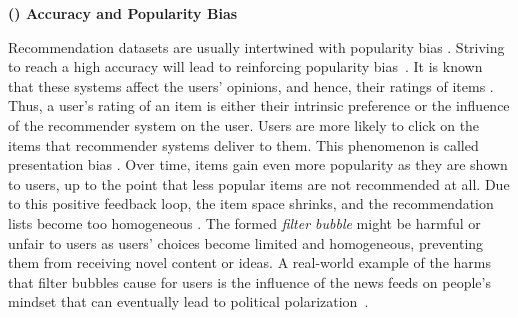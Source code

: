 

\vspace{0.25cm}
\noindent \textbf{() Accuracy and Popularity Bias}
\vspace{0.25cm}

Recommendation datasets are usually intertwined with popularity bias \cite{celma2008hits,lee2014fairness}. Striving to reach a high accuracy will lead to reinforcing popularity bias~\cite{barocas2016big}. It is known that these systems affect the users’ opinions, and hence, their ratings of items \cite{Cosley2003Influence}. Thus, a user’s rating of an item is either their intrinsic preference or the influence of the recommender system on the user. Users are more likely to click on the items that recommender systems deliver to them. This phenomenon is called presentation bias \cite{baeza2018bias}. 
Over time, items gain even more popularity as they are shown to users, up to the point that less popular items are not recommended at all. Due to this positive feedback loop, the item space shrinks, and the recommendation lists become too homogeneous \cite{Chaney2018Homogeneity}. The formed \textit{filter bubble} might be harmful or unfair to users as users' choices become limited and homogeneous, preventing them from receiving novel content or ideas. A real-world example of the harms that filter bubbles cause for users is the influence of the news feeds on people's mindset that can eventually lead to political polarization~\cite{HONG2016777}.


